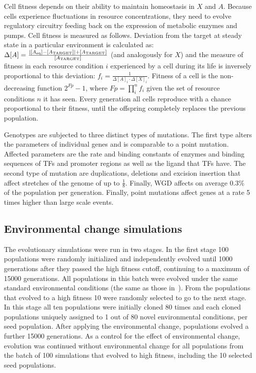 Cell fitness depends on their ability to maintain homeostasis in $X$ and $A$. Because cells experience fluctuations in resource concentrations, they need to evolve regulatory circuitry feeding back on the expression of metabolic enzymes and pumps. Cell fitness is measured as follows. Deviation from the target at steady state in a particular environment is calculated as: $\Delta[A] = \frac{|[A_{\textnormal{eq}}]-[A_{\textnormal{TARGET}}]|+[A_{\textnormal{TARGET}}]}{[A_{\textnormal{TARGET}}]}$ (and analogously for $X$) and the measure of fitness in each resource condition $i$ experienced by a cell during its life is inversely proportional to this deviation: $f_i = \frac{1}{\Delta[A]_i \cdot \Delta[X]_i}$. Fitness of a cell is the non-decreasing function $2^{Fp}-1$, where $Fp = \prod_{i}^{n} f_i$ given the set of resource conditions $n$  it has seen. Every generation all cells reproduce with a chance proportional to their fitness, until the offspring completely replaces the previous population. 

Genotypes are subjected to three distinct types of mutations. The first type alters the parameters of individual genes and is comparable to a point mutation. Affected parameters are the rate and binding constants of enzymes and binding sequences of TFs and promoter regions as well as the ligand that  TFs have. The second type of mutation are duplications, deletions and excision insertion that affect stretches of the genome of up to $\frac{1}{8}$. Finally, WGD affects on average $0.3\%$ of the population per generation. Finally, point mutations affect genes at a rate 5 times higher than large scale events. 

\subsection{Environmental change simulations}
The evolutionary simulations were run in two stages. In the first stage 100 populations were randomly initialized and independently evolved until 1000 generations after they passed the high fitness cutoff, continuing to a maximum of 15000 generations. All populations in this batch were evolved under the same standard environmental conditions (the same as those in~\cite{cuypers_virtual_2012}). From the populations that evolved to a high fitness 10 were randomly selected to go to the next stage. In this stage all ten populations were initially cloned 80 times and each cloned populations uniquely assigned to 1 out of 80 novel environmental conditions, per seed population. After applying the environmental change, populations evolved a further 15000 generations. As a control for the effect of environmental change, evolution was continued without environmental change for all populations from the batch of 100 simulations that evolved to high fitness, including the 10 selected seed populations.

